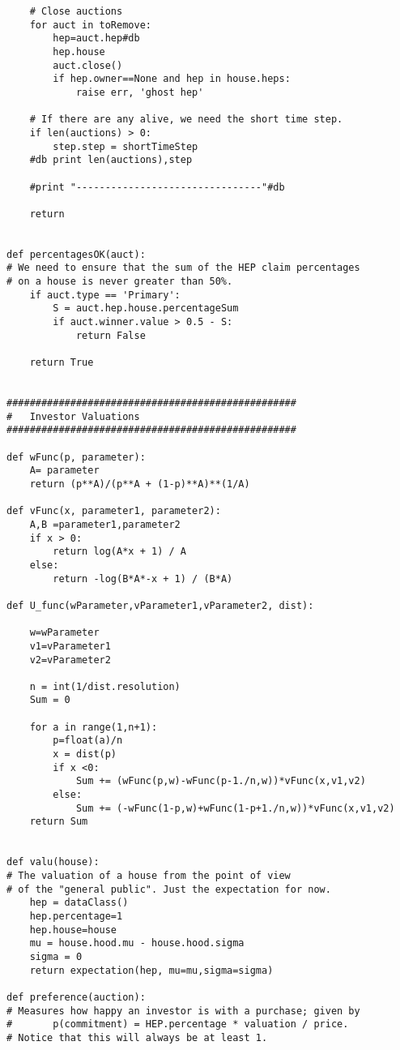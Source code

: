 \begin{lstlisting}
    # Close auctions
    for auct in toRemove:
        hep=auct.hep#db
        hep.house
        auct.close()
        if hep.owner==None and hep in house.heps:
            raise err, 'ghost hep'
        
    # If there are any alive, we need the short time step.
    if len(auctions) > 0:
        step.step = shortTimeStep
    #db print len(auctions),step

    #print "--------------------------------"#db

    return


def percentagesOK(auct):
# We need to ensure that the sum of the HEP claim percentages
# on a house is never greater than 50%.
    if auct.type == 'Primary':
        S = auct.hep.house.percentageSum
        if auct.winner.value > 0.5 - S:
            return False

    return True
        
            
##################################################
#   Investor Valuations
##################################################

def wFunc(p, parameter):
    A= parameter
    return (p**A)/(p**A + (1-p)**A)**(1/A)

def vFunc(x, parameter1, parameter2):
    A,B =parameter1,parameter2
    if x > 0:
        return log(A*x + 1) / A
    else:
        return -log(B*A*-x + 1) / (B*A)

def U_func(wParameter,vParameter1,vParameter2, dist):

    w=wParameter
    v1=vParameter1
    v2=vParameter2

    n = int(1/dist.resolution)
    Sum = 0
        
    for a in range(1,n+1):
        p=float(a)/n
        x = dist(p)
        if x <0:
            Sum += (wFunc(p,w)-wFunc(p-1./n,w))*vFunc(x,v1,v2)
        else:
            Sum += (-wFunc(1-p,w)+wFunc(1-p+1./n,w))*vFunc(x,v1,v2)
    return Sum
        
        
def valu(house):
# The valuation of a house from the point of view
# of the "general public". Just the expectation for now.
    hep = dataClass()
    hep.percentage=1
    hep.house=house
    mu = house.hood.mu - house.hood.sigma
    sigma = 0
    return expectation(hep, mu=mu,sigma=sigma)

def preference(auction):
# Measures how happy an investor is with a purchase; given by
#       p(commitment) = HEP.percentage * valuation / price.
# Notice that this will always be at least 1.


\end{lstlisting}
